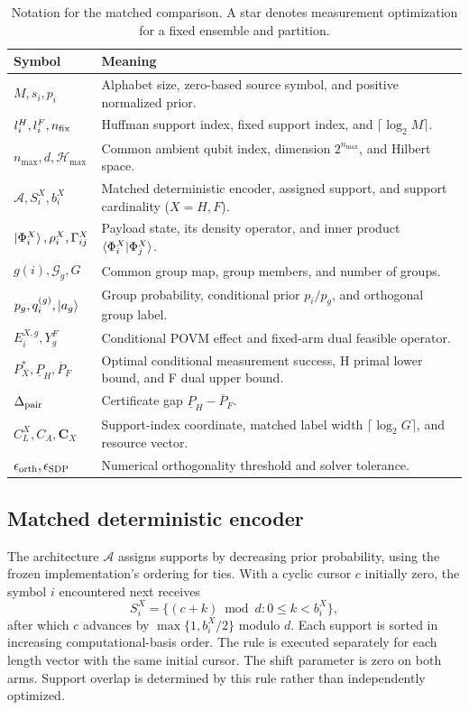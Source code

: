 \documentclass[reprint,amsmath,amssymb,aps,pra,floatfix]{revtex4-2}
\begin{document}
\begin{table}[tbp]
\caption{Notation for the matched comparison. A star denotes measurement optimization for a fixed ensemble and partition.}
\label{tab:notation}
\centering\small
\begin{tabular}{@{}p{}p{}@{}}
\toprule
\textbf{Symbol} & \textbf{Meaning}\\
\midrule
$M,s_i,p_i$ & Alphabet size, zero-based source symbol, and positive normalized prior.\\
$l_i^H,l_i^F,n_{\rm fix}$ & Huffman support index, fixed support index, and $\lceil\log_2M\rceil$.\\
$n_{\max},d,\mathcal H_{\max}$ & Common ambient qubit index, dimension $2^{n_{\max}}$, and Hilbert space.\\
$\mathcal A,S_i^X,b_i^X$ & Matched deterministic encoder, assigned support, and support cardinality ($X=H,F$).\\
$\ket{\Phi_i^X},\rho_i^X,\Gamma_{ij}^X$ & Payload state, its density operator, and inner product $\braket{\Phi_i^X|\Phi_j^X}$.\\
$g(i),\mathcal G_g,G$ & Common group map, group members, and number of groups.\\
$p_g,q_i^{(g)},\ket{a_g}$ & Group probability, conditional prior $p_i/p_g$, and orthogonal group label.\\
$E_i^{X,g},Y_g^F$ & Conditional POVM effect and fixed-arm dual feasible operator.\\
$P_X^*,\underline P_H,\overline P_F$ & Optimal conditional measurement success, H primal lower bound, and F dual upper bound.\\
$\Delta_{\rm pair}$ & Certificate gap $\underline P_H-\overline P_F$.\\
$C_L^X,C_A,\mathbf C_X$ & Support-index coordinate, matched label width $\lceil\log_2G\rceil$, and resource vector.\\
$\epsilon_{\rm orth},\epsilon_{\rm SDP}$ & Numerical orthogonality threshold and solver tolerance.\\
\bottomrule
\end{tabular}
\end{table}

\subsection{Matched deterministic encoder}
\label{sec:encoder}
The architecture $\mathcal A$ assigns supports by decreasing prior probability, using the frozen implementation's ordering for ties. With a cyclic cursor $c$ initially zero, the symbol $i$ encountered next receives
\begin{equation}
 S_i^X=\{(c+k)\bmod d:0\le k<b_i^X\},
 \label{eq:support-rule}
\end{equation}
after which $c$ advances by $\max\{1,b_i^X/2\}$ modulo $d$. Each support is sorted in increasing computational-basis order. The rule is executed separately for each length vector with the same initial cursor. The shift parameter is zero on both arms. Support overlap is determined by this rule rather than independently optimized.
\end{document}
